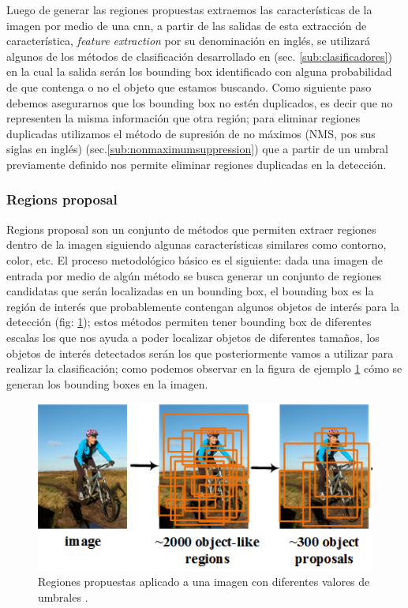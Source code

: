 Luego de generar las regiones propuestas extraemos las características de la imagen por medio de una \ac{cnn}, a partir de las salidas de esta extracción de característica, \textit{feature extraction} por su denominación en inglés, se utilizará algunos de los métodos de clasificación desarrollado en (sec. \ref{sub:clasificadores}) en la cual la salida serán los bounding box identificado con alguna probabilidad de que contenga o no el objeto que estamos buscando. Como siguiente paso debemos  asegurarnos que los bounding box no estén duplicados, es decir que no representen la misma información que otra región; para eliminar regiones duplicadas utilizamos el método de supresión de no máximos (NMS, pos sus siglas en inglés) (sec.\ref{sub:nonmaximumsuppression}) que a partir de un umbral previamente definido nos permite eliminar regiones duplicadas en la detección.



\subsubsection{Regions proposal} \label{sub:regions-proposal}

Regions proposal son un conjunto de métodos que permiten extraer regiones dentro de la imagen siguiendo algunas características similares como contorno, color, etc. El proceso metodológico básico es el siguiente: dada una imagen de entrada por medio de algún método se busca generar un conjunto de regiones candidatas que serán localizadas en un bounding box, el bounding box es la región de interés que probablemente contengan algunos objetos de interés para la detección (fig: \ref{Fig: propsalregion}); estos métodos permiten tener bounding box de diferentes escalas los que nos ayuda a poder localizar objetos de diferentes tamaños, los objetos de interés detectados serán los que posteriormente vamos a utilizar para realizar la clasificación; como podemos observar en la figura de ejemplo \ref{Fig: propsalregion} cómo se generan los bounding boxes en la imagen.

\begin{figure}[H] \centering
  \includegraphics[scale=0.6,keepaspectratio=true,clip=true]{imagenes/MarcoTeorico/regionProposal.png}
  \caption{Regiones propuestas aplicado a una imagen con diferentes valores de umbrales \citep{regions_proposal_gr}.}
	\label{Fig: propsalregion}
\end{figure}

